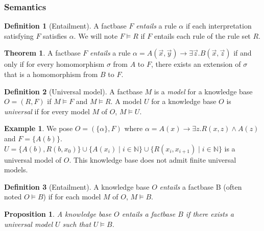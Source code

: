 \documentclass{article}
\newtheorem{proposition}{Proposition}[section]
\theoremstyle{definition}
\newtheorem{definition}{Definition}[section]
\newtheorem{theorem}{Theorem}[section]
\newtheorem{example}{Example}[section]
\theoremstyle{remark}
\def \N {\mathbb N}
\begin{document}
\subsubsection{Semantics}

\begin{definition}[Entailment]
A factbase $F$ \emph{entails} a rule $\alpha$ if each interpretation satisfying $F$ satisfies $\alpha$. We will note $F \models R$ if $F$ entails each rule of the rule set $R$.
\end{definition}

\begin{theorem}
A factbase $F$ \emph{entails} a rule $\alpha = A(\vec x,\vec y) \rightarrow \exists \vec z. B(\vec x,\vec z)$ if and only if for every homomorphism $\sigma$ from $A$ to $F$, there exists an extension of $\sigma$ that is a homomorphism from $B$ to $F$.
\end{theorem}



\begin{definition}[Universal model]
A factbase $M$ is a \emph{model} for a knowledge base $O = (R,F)$ if $M \models F$ and $M \models R$.  A model $U$ for a knowledge base $O$ is \emph{universal} if for
every model $M$ of $O$, $M \models U$.
\end{definition}


\begin{example} We pose $O = (\{\alpha\},F)$ where $\alpha = A(x) \rightarrow \exists z.R(x,z) \wedge A(z)$ and $F = \{A(b)\}$. $U = \{A(b),R(b,x_0)\}\cup \{A(x_i)\mid i \in \N\}\cup \{R(x_i,x_{i+1}) \mid i \in \N\}$ is a universal model of $O$. This knowledge base does not admit finite universal models.
\end{example}

\begin{definition}[Entailment]
A knowledge base $O$ \emph{entails} a factbase B (often noted $O \models B$) if for each model $M$ of $O$, $M \models B$.
\end{definition}




\begin{proposition}
A knowledge base $O$ entails a factbase $B$ if there exists a universal model $U$ such that $U \models B$.
\end{proposition}
\end{document}
